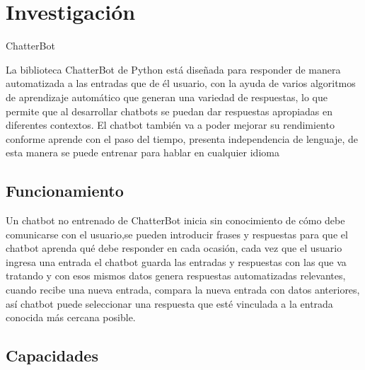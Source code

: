 \documentclass[a4paper,12pt]{article}
\begin{document}


\newpage
\section{Investigación}

\begin{center}
    {\large ChatterBot}
\end{center}

La biblioteca ChatterBot de Python está diseñada para responder de manera automatizada a las entradas que de él usuario, con la ayuda 
de varios algoritmos de aprendizaje automático que generan una variedad de respuestas, lo que permite que al desarrollar chatbots se 
puedan dar respuestas apropiadas en diferentes contextos. El chatbot también va a poder mejorar su rendimiento conforme aprende con 
el paso del tiempo, presenta independencia de lenguaje, de esta manera se puede entrenar para hablar en cualquier idioma


\subsection{Funcionamiento}

Un chatbot no entrenado de ChatterBot inicia sin conocimiento de cómo debe comunicarse con el usuario,se pueden introducir frases y 
respuestas para que el chatbot aprenda qué debe responder en cada ocasión, cada vez que el usuario ingresa una entrada el chatbot 
guarda las entradas y respuestas con las que va tratando y con esos mismos datos genera respuestas automatizadas relevantes, cuando 
recibe una nueva entrada, compara la nueva entrada con datos anteriores, así chatbot puede seleccionar una respuesta que esté vinculada 
a la entrada conocida más cercana posible.

\subsection{Capacidades}
\end{document}
